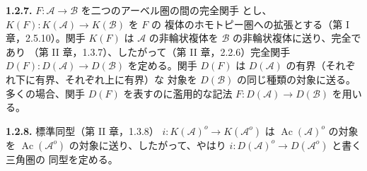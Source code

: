 \medskip\noindent\textbf{1.2.7.}\quad
$F\colon\mathcal A\longrightarrow\mathcal B$ を二つのアーベル圏の間の完全関手
とし、$K(F)\colon K(\mathcal A)\longrightarrow K(\mathcal B)$ を $F$ の
複体のホモトピー圏への拡張とする（第 I 章，2.5.10）。関手 $K(F)$ は
$\mathcal A$ の非輪状複体を $\mathcal B$ の非輪状複体に送り、完全であり
（第 II 章，1.3.7）、したがって（第 II 章，2.2.6）完全関手
$D(F)\colon D(\mathcal A)\longrightarrow D(\mathcal B)$ を定める。関手
$D(F)$ は $D(\mathcal A)$ の有界（それぞれ下に有界、それぞれ上に有界）な
対象を $D(\mathcal B)$ の同じ種類の対象に送る。多くの場合、関手 $D(F)$
を表すのに濫用的な記法 $F\colon D(\mathcal A)\longrightarrow D(\mathcal B)$
を用いる。

\medskip\noindent\textbf{1.2.8.}\quad
標準同型（第 II 章，1.3.8）
$i\colon K(\mathcal A)^o\longrightarrow K(\mathcal A^o)$ は
$\operatorname{Ac}(\mathcal A)^o$ の対象を
$\operatorname{Ac}(\mathcal A^o)$ の対象に送り、したがって、やはり
$i\colon D(\mathcal A)^o\longrightarrow D(\mathcal A^o)$ と書く三角圏の
同型を定める。
\endgroup
